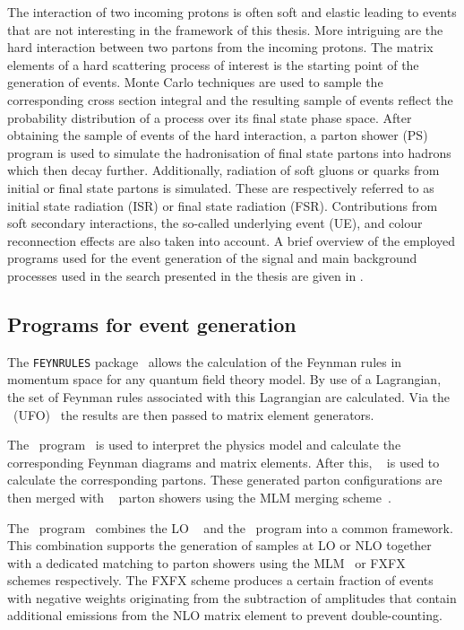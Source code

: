 The interaction of two incoming protons is often soft and elastic leading to events that are not interesting in the framework of this thesis. More intriguing are the hard interaction between two partons from the incoming protons. The matrix elements   of a hard scattering process of interest is the starting point of the generation of events. Monte Carlo techniques are used to sample the corresponding cross section integral and the resulting sample of events reflect the probability distribution of a process over its final state phase space. After obtaining the sample of events of the hard interaction, a parton shower (PS) program is used to simulate the hadronisation of final state partons into hadrons which then  decay further. Additionally, radiation of soft gluons or quarks from initial or final state partons is simulated. These are respectively referred to as initial state radiation (ISR) or final state radiation (FSR). Contributions from soft secondary interactions, the so-called underlying event (UE), and colour reconnection effects are also taken into account. 
A brief overview of the employed programs used for the event generation of the signal and main background processes used in the search presented in the thesis are given in .

\subsection{Programs for event generation}
\label{sec:programs}
The \texttt{FEYNRULES} package~\cite{Alloul:2013bka} allows the calculation of  the Feynman rules in momentum space for any quantum field theory model. By use of a Lagrangian, the set of Feynman rules associated with this Lagrangian are calculated. Via the \UFO\ (UFO)~\cite{Degrande:2011ua} the results are then passed to matrix element generators. 


The \MG\  program~\cite{Alwall:2011uj} is used to interpret the physics model and calculate the corresponding Feynman diagrams and matrix elements. After this, \ME~\cite{Mangano:2006rw} is used to calculate the corresponding partons. These generated parton configurations are then merged with \Pythia~\cite{Sjostrand2015159,Sjostrand:2006za,Sjostrand:2014zea} parton showers using the MLM merging scheme~\cite{Alwall:2007fs}. 

The \aMCMG\ program~\cite{Alwall:2014hca} combines the LO \MG~\cite{Alwall:2011uj} and the \aMC\ program into a common framework. This combination supports the generation of samples at LO or NLO together with a dedicated matching to parton showers  using the MLM~\cite{Alwall:2007fs} or FXFX~\cite{Frederix:2012ps} schemes respectively. The FXFX scheme produces a certain fraction of events with negative weights originating from the subtraction of amplitudes that contain additional emissions from the NLO matrix element to prevent double-counting.



